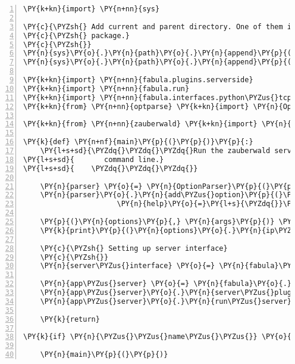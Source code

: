 \begin{Verbatim}[commandchars=\\\{\},numbers=left,firstnumber=1,stepnumber=1]
\PY{k+kn}{import} \PY{n+nn}{sys}

\PY{c}{\PYZsh{} Add current and parent directory. One of them is supposed to contain the fabula}
\PY{c}{\PYZsh{} package.}
\PY{c}{\PYZsh{}}
\PY{n}{sys}\PY{o}{.}\PY{n}{path}\PY{o}{.}\PY{n}{append}\PY{p}{(}\PY{l+s}{\PYZdq{}}\PY{l+s}{../}\PY{l+s}{\PYZdq{}}\PY{p}{)}
\PY{n}{sys}\PY{o}{.}\PY{n}{path}\PY{o}{.}\PY{n}{append}\PY{p}{(}\PY{l+s}{\PYZdq{}}\PY{l+s}{./}\PY{l+s}{\PYZdq{}}\PY{p}{)}

\PY{k+kn}{import} \PY{n+nn}{fabula.plugins.serverside}
\PY{k+kn}{import} \PY{n+nn}{fabula.run}
\PY{k+kn}{import} \PY{n+nn}{fabula.interfaces.python\PYZus{}tcp}
\PY{k+kn}{from} \PY{n+nn}{optparse} \PY{k+kn}{import} \PY{n}{OptionParser}

\PY{k+kn}{from} \PY{n+nn}{zauberwald} \PY{k+kn}{import} \PY{n}{ZWServerPlugin}

\PY{k}{def} \PY{n+nf}{main}\PY{p}{(}\PY{p}{)}\PY{p}{:}
    \PY{l+s+sd}{\PYZdq{}\PYZdq{}\PYZdq{}Run the zauberwald server. Can optionally accept an ip address from the}
\PY{l+s+sd}{       command line.}
\PY{l+s+sd}{    \PYZdq{}\PYZdq{}\PYZdq{}}
    
    \PY{n}{parser} \PY{o}{=} \PY{n}{OptionParser}\PY{p}{(}\PY{p}{)}
    \PY{n}{parser}\PY{o}{.}\PY{n}{add\PYZus{}option}\PY{p}{(}\PY{l+s}{\PYZdq{}}\PY{l+s}{\PYZhy{}a}\PY{l+s}{\PYZdq{}}\PY{p}{,} \PY{n}{dest}\PY{o}{=}\PY{l+s}{\PYZdq{}}\PY{l+s}{ip\PYZus{}address}\PY{l+s}{\PYZdq{}}\PY{p}{,} \PY{n}{default}\PY{o}{=}\PY{l+s}{\PYZdq{}}\PY{l+s}{127.0.0.1}\PY{l+s}{\PYZdq{}}\PY{p}{,}
                      \PY{n}{help}\PY{o}{=}\PY{l+s}{\PYZdq{}}\PY{l+s}{IP address of the server (default is 127.0.0.1)}\PY{l+s}{\PYZdq{}}\PY{p}{)}
    
    \PY{p}{(}\PY{n}{options}\PY{p}{,} \PY{n}{args}\PY{p}{)} \PY{o}{=} \PY{n}{parser}\PY{o}{.}\PY{n}{parse\PYZus{}args}\PY{p}{(}\PY{p}{)}
    \PY{k}{print}\PY{p}{(}\PY{n}{options}\PY{o}{.}\PY{n}{ip\PYZus{}address}\PY{p}{)}

    \PY{c}{\PYZsh{} Setting up server interface}
    \PY{c}{\PYZsh{}}
    \PY{n}{server\PYZus{}interface} \PY{o}{=} \PY{n}{fabula}\PY{o}{.}\PY{n}{interfaces}\PY{o}{.}\PY{n}{python\PYZus{}tcp}\PY{o}{.}\PY{n}{TCPServerInterface}\PY{p}{(}\PY{p}{)}

    \PY{n}{app\PYZus{}server} \PY{o}{=} \PY{n}{fabula}\PY{o}{.}\PY{n}{run}\PY{o}{.}\PY{n}{App}\PY{p}{(}\PY{n}{timeout}\PY{o}{=}\PY{l+m+mi}{0}\PY{p}{)}
    \PY{n}{app\PYZus{}server}\PY{o}{.}\PY{n}{server\PYZus{}plugin\PYZus{}class} \PY{o}{=} \PY{n}{ZWServerPlugin}
    \PY{n}{app\PYZus{}server}\PY{o}{.}\PY{n}{run\PYZus{}server}\PY{p}{(}\PY{l+m+mi}{30}\PY{p}{,} \PY{n}{server\PYZus{}interface}\PY{p}{,} \PY{l+m+mf}{0.8}\PY{p}{,}  \PY{n}{options}\PY{o}{.}\PY{n}{ip\PYZus{}address}\PY{p}{,} \PY{n+nb+bp}{True}\PY{p}{)}

    \PY{k}{return}

\PY{k}{if} \PY{n}{\PYZus{}\PYZus{}name\PYZus{}\PYZus{}} \PY{o}{==} \PY{l+s}{\PYZdq{}}\PY{l+s}{\PYZus{}\PYZus{}main\PYZus{}\PYZus{}}\PY{l+s}{\PYZdq{}}\PY{p}{:}

    \PY{n}{main}\PY{p}{(}\PY{p}{)}
\end{Verbatim}
